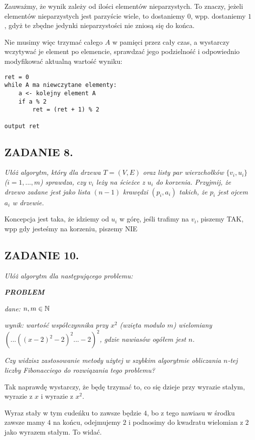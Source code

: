 \documentclass{article}
\begin{document}
Zauważmy, że wynik zależy od ilości elementów nieparzystych. To znaczy, jeżeli elementów nieparzystych jest parzyście wiele, to dostaniemy $0$, wpp. dostaniemy $1$, gdyż te zbędne jedynki nieparzystości nie zniosą się do końca.

Nie musimy więc trzymać całego $A$ w pamięci przez cały czas, a wystarczy wczytywać je element po elemencie, sprawdzać jego podzielność i odpowiednio modyfikować aktualną wartość wyniku:
\begin{lstlisting}
ret = 0
while A ma niewczytane elementy:
    a <- kolejny element A
    if a % 2
        ret = (ret + 1) % 2
    
output ret
\end{lstlisting}

\subsection*{ZADANIE 8.}
\emph{Ułóż algorytm, który dla drzewa $T=(V, E)$ oraz listy par wierzchołków $\{v_i,u_i\}$ ($i=1,...,m$) sprawdza, czy $v_i$ leży na ścieżce z $u_i$ do korzenia. Przyjmij, że drzewo zadane jest jako lista $(n-1)$ krawędzi $(p_i,a_i)$ takich, że $p_i$ jest ojcem $a_i$ w drzewie.}

Koncepcja jest taka, że idziemy od $u_i$ w górę, jeśli trafimy na $v_i$, piszemy TAK, wpp gdy jesteśmy na korzeniu, piszemy NIE

\subsection*{ZADANIE 10.}
\emph{Ułóż algorytm dla następującego problemu:}

\emph{\textbf{PROBLEM}}

\emph{dane: $n,m\in\mathbb{N}$}

\emph{wynik: wartość współczynnika przy $x^2$ (wzięta modulo $m$) wielomiany $(...((x-2)^2-2)^2...-2)^2$, gdzie nawiasów ogółem jest $n$.}

\emph{Czy widzisz zastosowanie metody użytej w szybkim algorytmie obliczania $n$-tej liczby Fibonacciego do rozwiązania tego problemu?}
\medskip

Tak naprawdę wystarczy, że będę trzymać to, co się dzieje przy wyrazie stałym, wyrazie z $x$ i wyrazie z $x^2$. 

Wyraz stały w tym cudeńku to zawsze będzie $4$, bo z tego nawiasu w środku zawsze mamy $4$ na końcu, odejmujemy $2$ i podnosimy do kwadratu wielomian z $2$ jako wyrazem stałym. To widać. 
\end{document}
